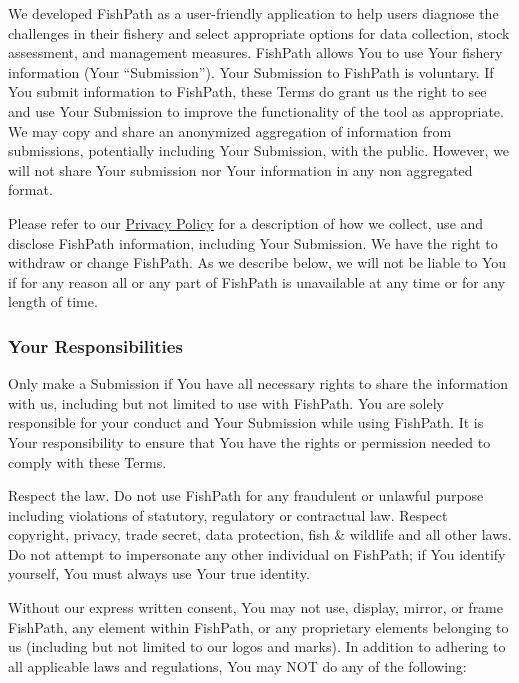 \documentclass[
  11pt,
]{book}
\begin{document}
We developed FishPath as a user-friendly application to help users diagnose the challenges in their fishery and select appropriate options for data collection, stock assessment, and management measures. FishPath allows You to use Your fishery information (Your ``Submission''). Your Submission to FishPath is voluntary. If You submit information to FishPath, these Terms do grant us the right to see and use Your Submission to improve the functionality of the tool as appropriate. We may copy and share an anonymized aggregation of information from submissions, potentially including Your Submission, with the public. However, we will not share Your submission nor Your information in any non aggregated format.

Please refer to our \href{https://www.nature.org/en-us/about-us/who-we-are/accountability/privacy-policy/}{Privacy Policy} for a description of how we collect, use and disclose FishPath information, including Your Submission. We have the right to withdraw or change FishPath. As we describe below, we will not be liable to You if for any reason all or any part of FishPath is unavailable at any time or for any length of time.

\hypertarget{your-responsibilities}{%
\subsubsection*{Your Responsibilities}\label{your-responsibilities}}

Only make a Submission if You have all necessary rights to share the information with us, including but not limited to use with FishPath. You are solely responsible for your conduct and Your Submission while using FishPath. It is Your responsibility to ensure that You have the rights or permission needed to comply with these Terms.

Respect the law. Do not use FishPath for any fraudulent or unlawful purpose including violations of statutory, regulatory or contractual law. Respect copyright, privacy, trade secret, data protection, fish \& wildlife and all other laws. Do not attempt to impersonate any other individual on FishPath; if You identify yourself, You must always use Your true identity.

Without our express written consent, You may not use, display, mirror, or frame FishPath, any element within FishPath, or any proprietary elements belonging to us (including but not limited to our logos and marks). In addition to adhering to all applicable laws and regulations, You may NOT do any of the following:
\end{document}
